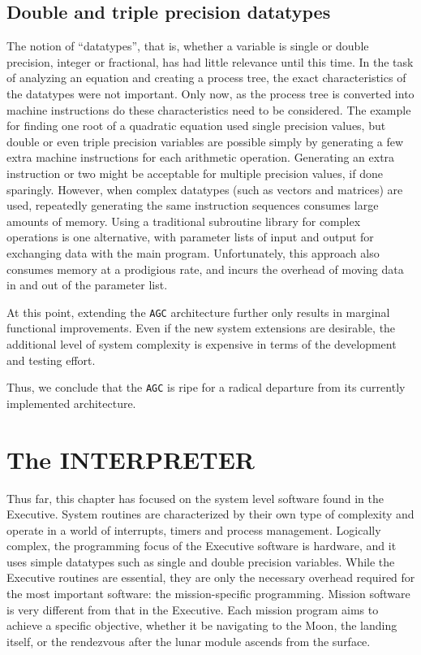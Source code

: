 \documentclass[refcap, oxford]{ahsan}
\begin{document}
\subsection{Double and triple precision datatypes}
The notion of ``datatypes'', that is, whether a variable is single or double precision, integer or fractional, has had little relevance until this time. In the task of analyzing an equation and creating a process tree, the exact characteristics of the datatypes were not important. Only now, as the process tree is converted into machine instructions do these characteristics need to be considered. The example for finding one root of a quadratic equation used single precision values, but double or even triple precision variables are possible simply by generating a few extra machine instructions for each arithmetic operation. Generating an extra instruction or two might be acceptable for multiple precision values, if done sparingly. However, when complex datatypes (such as vectors and matrices) are used, repeatedly generating the same instruction sequences consumes large amounts of memory. Using a traditional subroutine library for complex operations is one alternative, with parameter lists of input and output for exchanging data with the main program. Unfortunately, this approach also consumes memory at a prodigious rate, and incurs the overhead of moving data in and out of the parameter list.

At this point, extending the \texttt{AGC} architecture further only results in marginal functional improvements. Even if the new system extensions are desirable, the additional level of system complexity is expensive in terms of the development and testing effort.

Thus, we conclude that the \texttt{AGC} is ripe for a radical departure from its currently implemented architecture.



\section{The INTERPRETER}

Thus far, this chapter has focused on the system level software found in the Executive. System routines are characterized by their own type of complexity and operate in a world of interrupts, timers and process management. Logically complex, the programming focus of the Executive software is hardware, and it uses simple datatypes such as single and double precision variables. While the Executive routines are essential, they are only the necessary overhead required for the most important software: the mission-specific programming. Mission software is very different from that in the Executive. Each mission program aims to achieve a specific objective, whether it be navigating to the Moon, the landing itself, or the rendezvous after the lunar module ascends from the surface.
\end{document}
